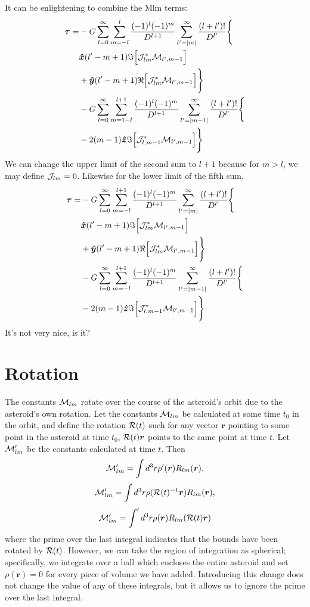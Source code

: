 \documentclass[aps,twocolumn,secnumarabic,balancelastpage,amsmath,amssymb,nofootinbib,floatfix]{revtex4-1}
\begin{document}
It can be enlightening to combine the Mlm terms:
\begin{equation*}
\begin{aligned}
\bm \tau = &-G\sum_{l=0}^\infty \sum_{m=-l}^l \frac{(-1)^l(-1)^{m}}{D^{l+1}}\sum_{l'=|m|}^\infty \frac{(l+l')!}{D^{l'}}\Bigg\{\\
&\bm{\hat x}(l'-m+1)\Im\Big[\mathcal{J}^*_{lm} \mathcal{M}_{l',m-1}\Big]\\
&+\bm{\hat y}(l'-m+1)\Re\Big[\mathcal{J}^*_{lm} \mathcal{M}_{l',m-1}\Big]\Bigg\}\\
&-G\sum_{l=0}^\infty \sum_{m=1-l}^{l+1} \frac{(-1)^l(-1)^{m}}{D^{l+1}}\sum_{l'=|m-1|}^\infty \frac{(l+l')!}{D^{l'}}\Bigg\{\\
&-2(m-1)\bm{\hat z}\Im\Big[\mathcal{J}_{l,m-1}^* \mathcal{M}_{l',m-1}\Big]\Bigg\}
\end{aligned}
\end{equation*}
We can change the upper limit of the second sum to $l+1$ because for $m>l$, we may define $\mathcal{J}_{lm} = 0$. Likewise for the lower limit of the fifth sum.
\begin{equation*}
\begin{aligned}
\bm \tau = &-G\sum_{l=0}^\infty \sum_{m=-l}^{l+1} \frac{(-1)^l(-1)^{m}}{D^{l+1}}\sum_{l'=|m|}^\infty \frac{(l+l')!}{D^{l'}}\Bigg\{\\
&\bm{\hat x}(l'-m+1)\Im\Big[\mathcal{J}^*_{lm} \mathcal{M}_{l',m-1}\Big]\\
&+\bm{\hat y}(l'-m+1)\Re\Big[\mathcal{J}^*_{lm} \mathcal{M}_{l',m-1}\Big]\Bigg\}\\
&-G\sum_{l=0}^\infty \sum_{m=-l}^{l+1} \frac{(-1)^l(-1)^{m}}{D^{l+1}}\sum_{l'=|m-1|}^\infty \frac{(l+l')!}{D^{l'}}\Bigg\{\\
&-2(m-1)\bm{\hat z}\Im\Big[\mathcal{J}_{l,m-1}^* \mathcal{M}_{l',m-1}\Big]\Bigg\}
\end{aligned}
\end{equation*}
It's not very nice, is it?

\section{Rotation}
The constants $\mathcal{M}_{lm}$ rotate over the course of the asteroid's orbit due to the asteroid's own rotation. Let the constants $\mathcal{M}_{lm}$ be calculated at some time $t_0$ in the orbit, and define the rotation $\mathcal{R}(t)$ such for any vector $\bm r$ pointing to some point in the asteroid at time $t_0$, $\mathcal{R}(t) \bm r$ points to the same point at time $t$. Let $\mathcal{M}'_{lm}$ be the constants calculated at time $t$. Then
$$\mathcal{M}'_{lm} = \int d^3 r \rho'(\bm r) R_{lm}(\bm r),$$
$$\mathcal{M}'_{lm} = \int d^3 r \rho(\mathcal{R}(t)^{-1}\bm r) R_{lm}(\bm r),$$
$$\mathcal{M}'_{lm} = \int' d^3 r \rho(\bm r) R_{lm}(\mathcal{R}(t) \bm r)$$
where the prime over the last integral indicates that the bounds have been rotated by $\mathcal{R}(t)$. However, we can take the region of integration as spherical; specifically, we integrate over a ball which encloses the entire asteroid and set $\rho(\bm r)=0$ for every piece of volume we have added. Introducing this change does not change the value of any of these integrals, but it allows us to ignore the prime over the last integral.
\end{document}
